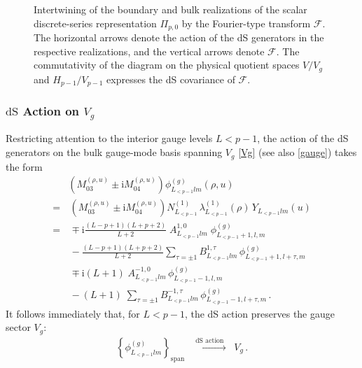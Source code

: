 \documentclass[aps,twocolumn,nofootinbib]{revtex4}
\begin{document}
{\begin{appendix}
\begin{figure}[h]
\begin{center}
    \end{center}
    \caption{Intertwining of the boundary and bulk realizations of the scalar discrete-series representation $\Pi_{p,0}$ by the Fourier-type transform $\mathcal{F}$. The horizontal arrows denote the action of the dS generators in the respective realizations, and the vertical arrows denote $\mathcal{F}$. The commutativity of the diagram on the physical quotient spaces $V/V_g$ and $H_{p-1}/V_{p-1}$ expresses the dS covariance of $\mathcal{F}$.}
    \label{fig:intertwining}
\end{figure}


\subsubsection{$\mathrm{dS}$ Action on $V_g$}

Restricting attention to the interior gauge levels $L<p-1$, the action of the dS generators on the bulk gauge-mode basis spanning $V_g$ \eqref{Vg} (see also \eqref{gauge}) takes the form
\begin{align}
    &\!\!\!\!\!\!\!\left(M_{03}^{(\rho, u)} \pm \mathrm{i}M_{04}^{(\rho, u)}\right) \phi^{(g)}_{L^{}_{<p-1}lm}(\rho,u) \nonumber\\[3pt]
    =&\, \left(M_{03}^{(\rho, u)} \pm \mathrm{i} M_{04}^{(\rho, u)}\right) N^{(1)}_{L_{<p-1}}\, \lambda_{L_{<p-1}}^{(1)}(\rho)\, Y^{}_{L^{}_{<p-1}lm}(u) \nonumber\\[3pt]
    =&\, \mp\mathrm{i} \frac{(L-p+1)(L+p+2)}{L+2} \; A^{1,0}_{L^{}_{<p-1}lm}\;\phi^{(g)}_{L^{}_{<p-1}+1,l,m} \nonumber\\[3pt]    
    &\, -\! \frac{(L-p+1)(L+p+2)}{L+2} \!\! \sum_{\tau=\pm1} \!\!\! B^{1,\tau}_{L^{}_{<p-1}lm} \, \phi^{(g)}_{L^{}_{<p-1}+1,l+\tau,m} \nonumber\\[3pt]
    &\, \mp \mathrm{i} (L+1) \; A^{-1,0}_{L^{}_{<p-1}lm}\, \phi^{(g)}_{L^{}_{<p-1}-1,l,m} \nonumber\\[3pt]
    &\, - (L+1) \; \sum_{\tau=\pm1} B^{-1,\tau}_{L^{}_{<p-1}lm}\, \phi^{(g)}_{L^{}_{<p-1}-1,l+\tau,m} \,.
\end{align}
It follows immediately that, for $L<p-1$, the dS action preserves the gauge sector $V_g$:
\begin{align}
    \left\{\phi^{(g)}_{L^{}_{<p-1}lm}\right\}_{\mathrm{span}} \;\;\xrightarrow[]{\text{ dS action }}\;\; V_g \,.
\end{align}


\end{appendix}}
\end{document}
